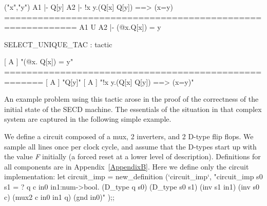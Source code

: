     ("x","y")   A1 |- Q[y]  A2 |- !x y.(Q[x] \AND Q[y]) ==> (x=y)
    ===========================================================
    	A1 U A2 |- (@x.Q[x]) = y


    SELECT_UNIQUE_TAC : tactic

            [ A ] "(@x. Q[x]) = y"
    =====================================================
    [ A ] "Q[y]"   [ A ] "!x y.(Q[x] \AND Q[y]) ==> (x=y)"
\endtt

An example problem using this tactic arose in the proof of the
correctness of the initial state of the SECD machine.  The essentials
of the situation in that complex system are captured in the following
simple example.

We define a circuit composed of a mux, 2 inverters, and 2 D-type flip
flops.  We sample all lines once per clock cycle, and assume that the
D-types start up with the value {\it F\/} initially (a forced reset at a
lower level of description).  Definitions for all components are in
Appendix~\ref{AppendixB}.  Here we define only the circuit
implementation:
\begintt
let circuit_imp = new_definition
(`circuit_imp`,
 "circuit_imp s0 s1 =
  ? q c in0 in1:num->bool.
    (D_type q s0)  \AND
    (D_type s0 s1) \AND
    (inv s1 in1)   \AND
    (inv s0 c)     \AND
    (mux2 c in0 in1 q) \AND
    (gnd in0)"
 );;
\endtt
